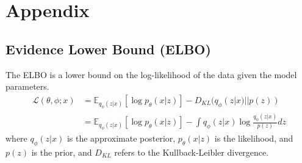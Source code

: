 \section{Appendix}\label{sec:appendix}

\subsection{Evidence Lower Bound (ELBO)}

The ELBO is a lower bound on the log-likelihood of the data given the model parameters.
\begin{equation}
    \begin{aligned}
        \mathcal{L}(\theta, \phi; x)
         & =
        \mathbb{E}_{q_\phi(z|x)} \left[ \log p_\theta(x|z) \right] - D_{KL}(q_\phi(z|x) || p(z))
        \\ & =
        \mathbb{E}_{q_\phi(z|x)}\left[\log p_\theta(x|z)\right] - \int q_\phi(z|x) \log \frac{q_\phi(z|x)}{p(z)} dz
    \end{aligned}
\end{equation}
where \(q_\phi(z|x)\) is the approximate posterior, \(p_\theta(x|z)\) is the likelihood, and \(p(z)\) is the prior, and \(D_{KL}\) refers to the Kullback-Leibler divergence.
